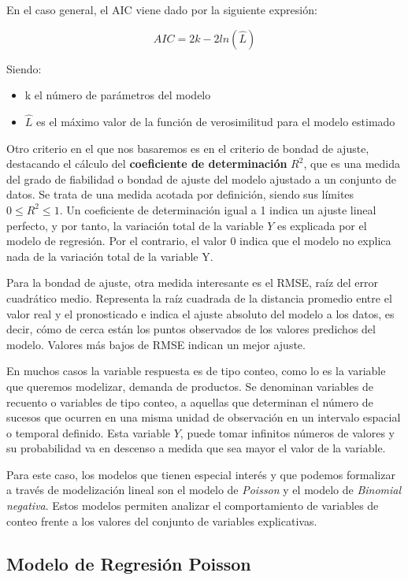 \documentclass[12pt,a4paper,]{book}
\providecommand{\tightlist}{%
  \setlength{\itemsep}{0pt}\setlength{\parskip}{0pt}}
\numberwithin{dummy}{section}
\theoremstyle{ocrenumbox}
\theoremstyle{blacknumex}
\theoremstyle{blacknumbox}
\theoremstyle{ocrenum}
\theoremstyle{ocrenum}
\begin{document}
En el caso general, el AIC viene dado por la siguiente expresión:

\[
AIC = 2k - 2ln(\hat L)
\]

Siendo:

\begin{itemize}
\tightlist
\item
  k el número de parámetros del modelo
\item
  \(\hat L\) es el máximo valor de la función de verosimilitud para el
  modelo estimado
\end{itemize}

Otro criterio en el que nos basaremos es en el criterio de bondad de
ajuste, destacando el cálculo del \textbf{coeficiente de determinación}
\(R^2\), que es una medida del grado de fiabilidad o bondad de ajuste
del modelo ajustado a un conjunto de datos. Se trata de una medida
acotada por definición, siendo sus límites \(0 \leq R^2 \leq 1\). Un
coeficiente de determinación igual a 1 indica un ajuste lineal perfecto,
y por tanto, la variación total de la variable \(Y\) es explicada por el
modelo de regresión. Por el contrario, el valor 0 indica que el modelo
no explica nada de la variación total de la variable Y.

Para la bondad de ajuste, otra medida interesante es el RMSE, raíz del
error cuadrático medio. Representa la raíz cuadrada de la distancia
promedio entre el valor real y el pronosticado e indica el ajuste
absoluto del modelo a los datos, es decir, cómo de cerca están los
puntos observados de los valores predichos del modelo. Valores más bajos
de RMSE indican un mejor ajuste.

En muchos casos la variable respuesta es de tipo conteo, como lo es la
variable que queremos modelizar, demanda de productos. Se denominan
variables de recuento o variables de tipo conteo, a aquellas que
determinan el número de sucesos que ocurren en una misma unidad de
observación en un intervalo espacial o temporal definido. Esta variable
\(Y\), puede tomar infinitos números de valores y su probabilidad va en
descenso a medida que sea mayor el valor de la variable.

Para este caso, los modelos que tienen especial interés y que podemos
formalizar a través de modelización lineal son el modelo de
\emph{Poisson} y el modelo de \emph{Binomial negativa}. Estos modelos
permiten analizar el comportamiento de variables de conteo frente a los
valores del conjunto de variables explicativas.

\hypertarget{modelo-de-regresiuxf3n-poisson}{%
\subsection{Modelo de Regresión
Poisson}\label{modelo-de-regresiuxf3n-poisson}}
\end{document}
